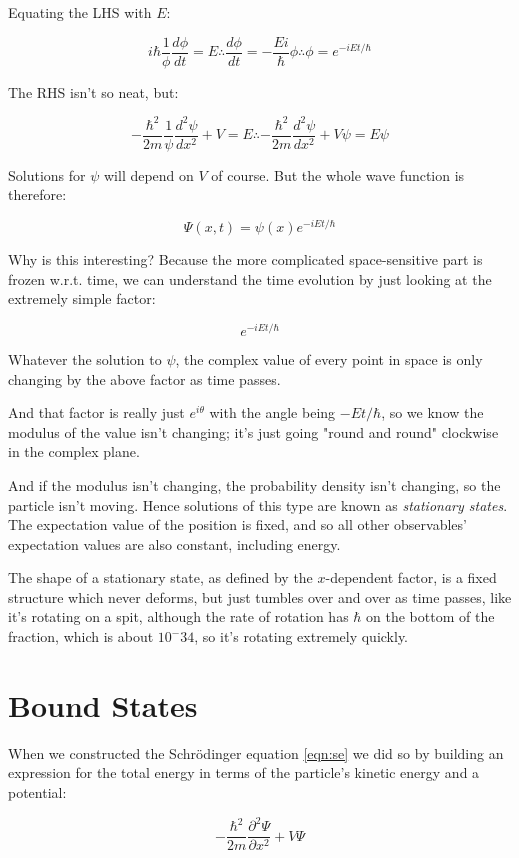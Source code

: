 Equating the LHS with $E$:

$$
i\hbar
\frac{1}{\phi}
\frac{d \phi}{d t}
= E
\therefore
\frac{d \phi}{d t}
=
- \frac{Ei}{\hbar}
\phi
\therefore
\phi = e^{-iEt/\hbar}
$$

The RHS isn't so neat, but:

$$
- \frac{\hbar^2}{2m}
\frac{1}{\psi}
\frac{d^2 \psi}{d x^2}
+ V
=
E
\therefore
- \frac{\hbar^2}{2m}
\frac{d^2 \psi}{d x^2}
+ V\psi
=
E\psi
$$

Solutions for $\psi$ will depend on $V$ of course. But the whole wave function is therefore:

$$\Psi(x, t) = \psi(x) e^{-iEt/\hbar}$$

Why is this interesting? Because the more complicated space-sensitive part is frozen w.r.t. time, we can understand the time evolution by just looking at the extremely simple factor:

$$
e^{-iEt/\hbar}
$$

Whatever the solution to $\psi$, the complex value of every point in space is only changing by the above factor as time passes.

And that factor is really just $e^{i\theta}$ with the angle being $-Et/\hbar$, so we know the modulus of the value isn't changing; it's just going "round and round" clockwise in the complex plane.

And if the modulus isn't changing, the probability density isn't changing, so the particle isn't moving. Hence solutions of this type are known as \textit{stationary states}. The expectation value of the position is fixed, and so all other observables' expectation values are also constant, including energy.

The shape of a stationary state, as defined by the $x$-dependent factor, is a fixed structure which never deforms, but just tumbles over and over as time passes, like it's rotating on a spit, although the rate of rotation has $\hbar$ on the bottom of the fraction, which is about $10^-34$, so it's rotating extremely quickly.

\section{Bound States}

When we constructed the Schrödinger equation \eqref{eqn:se} we did so by building an expression for the total energy in terms of the particle's kinetic energy and a potential:

$$
- \frac{\hbar^2}{2m} \frac{\partial^2 \Psi}{\partial x^2} + V{\Psi}
$$  

